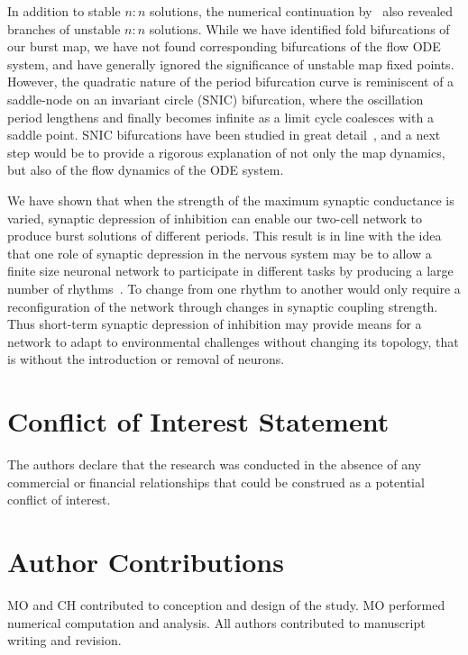 \documentclass[utf8]{frontiersFPHY} %
\begin{document}
In addition to stable $n:n$ solutions, the numerical continuation by~\citet{bose2011} also revealed branches of unstable $n:n$ solutions. While we have identified fold bifurcations of our burst map, we have not found corresponding bifurcations of the flow ODE system, and have generally ignored the significance of unstable map fixed points. However, the quadratic nature of the period bifurcation curve is reminiscent of a saddle-node on an invariant circle (SNIC) bifurcation, where the oscillation period lengthens and finally becomes infinite as a limit cycle coalesces with a saddle point.
SNIC bifurcations have been studied in great detail~\cite[e.g.][]{ermentrout1986}, and a next step would be to provide a rigorous explanation of not only the map dynamics, but also of the flow dynamics of the ODE system.

We have shown that when the strength of the maximum synaptic conductance is varied, synaptic depression of inhibition can enable our two-cell network to produce burst solutions of different periods.
This result is in line with the idea that one role of synaptic depression in the nervous system may be to allow a finite size neuronal network to participate in different tasks by producing a large number of rhythms~\citep{bose2011, jalil2004, li2007}.
To change from one rhythm to another would only require a reconfiguration of the network through changes in synaptic coupling strength.
Thus short-term synaptic depression of inhibition may provide means for a network to adapt to environmental challenges without changing its topology, that is without the introduction or removal of neurons.


\section*{Conflict of Interest Statement}
The authors declare that the research was conducted in the absence of any commercial or
financial relationships that could be construed as a potential conflict of interest.

\section*{Author Contributions}
MO and CH contributed to conception and design of the study.
MO performed numerical computation and analysis.
All authors contributed to manuscript writing and revision.
\end{document}
